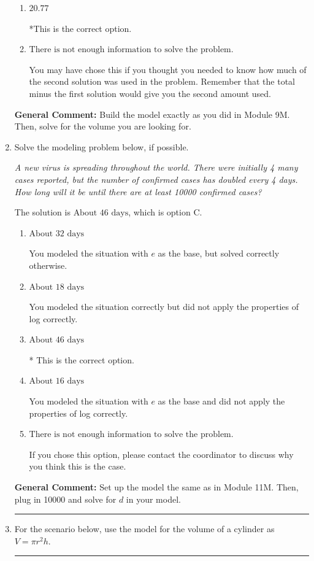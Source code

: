 \documentclass{extbook}[14pt]
\newcommand{\litem}[1]{\item #1

\rule{\textwidth}{0.4pt}}
\begin{document}
\begin{enumerate}
{\begin{enumerate}[label=\Alph*.]
This was a random value. If this was not a guess, contact the coordinator to talk about how you got this value.
\item \( 20.77 \)

*This is the correct option.
\item \( \text{There is not enough information to solve the problem.} \)

You may have chose this if you thought you needed to know how much of the second solution was used in the problem. Remember that the total minus the first solution would give you the second amount used.
\end{enumerate}

\textbf{General Comment:} Build the model exactly as you did in Module 9M. Then, solve for the volume you are looking for.
}
\litem{
Solve the modeling problem below, if possible.

\begin{center}
    \textit{ A new virus is spreading throughout the world. There were initially 4 many cases reported, but the number of confirmed cases has doubled every 4 days. How long will it be until there are at least 10000 confirmed cases? }
\end{center}
The solution is \( \text{About } 46 \text{ days} \), which is option C.\begin{enumerate}[label=\Alph*.]
\item \( \text{About } 32 \text{ days} \)

You modeled the situation with $e$ as the base, but solved correctly otherwise.
\item \( \text{About } 18 \text{ days} \)

You modeled the situation correctly but did not apply the properties of log correctly.
\item \( \text{About } 46 \text{ days} \)

* This is the correct option.
\item \( \text{About } 16 \text{ days} \)

You modeled the situation with $e$ as the base and did not apply the properties of log correctly.
\item \( \text{There is not enough information to solve the problem.} \)

If you chose this option, please contact the coordinator to discuss why you think this is the case.
\end{enumerate}

\textbf{General Comment:} Set up the model the same as in Module 11M. Then, plug in 10000 and solve for $d$ in your model.
}
\litem{
For the scenario below, use the model for the volume of a cylinder as $V = \pi r^2 h$.

}
\end{enumerate}
\end{document}

